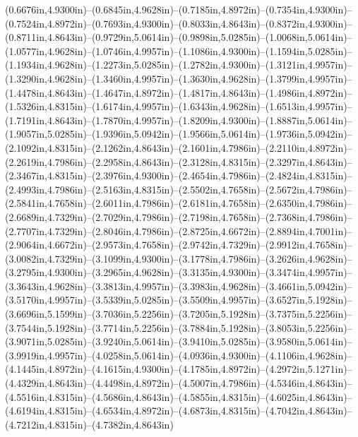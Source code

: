 (0.6676in,4.9300in)--(0.6845in,4.9628in)--(0.7185in,4.8972in)--(0.7354in,4.9300in)--(0.7524in,4.8972in)--(0.7693in,4.9300in)--(0.8033in,4.8643in)--(0.8372in,4.9300in)--(0.8711in,4.8643in)--(0.9729in,5.0614in)--(0.9898in,5.0285in)--(1.0068in,5.0614in)--(1.0577in,4.9628in)--(1.0746in,4.9957in)--(1.1086in,4.9300in)--(1.1594in,5.0285in)--(1.1934in,4.9628in)--(1.2273in,5.0285in)--(1.2782in,4.9300in)--(1.3121in,4.9957in)--(1.3290in,4.9628in)--(1.3460in,4.9957in)--(1.3630in,4.9628in)--(1.3799in,4.9957in)--(1.4478in,4.8643in)--(1.4647in,4.8972in)--(1.4817in,4.8643in)--(1.4986in,4.8972in)--(1.5326in,4.8315in)--(1.6174in,4.9957in)--(1.6343in,4.9628in)--(1.6513in,4.9957in)--(1.7191in,4.8643in)--(1.7870in,4.9957in)--(1.8209in,4.9300in)--(1.8887in,5.0614in)--(1.9057in,5.0285in)--(1.9396in,5.0942in)--(1.9566in,5.0614in)--(1.9736in,5.0942in)--(2.1092in,4.8315in)--(2.1262in,4.8643in)--(2.1601in,4.7986in)--(2.2110in,4.8972in)--(2.2619in,4.7986in)--(2.2958in,4.8643in)--(2.3128in,4.8315in)--(2.3297in,4.8643in)--(2.3467in,4.8315in)--(2.3976in,4.9300in)--(2.4654in,4.7986in)--(2.4824in,4.8315in)--(2.4993in,4.7986in)--(2.5163in,4.8315in)--(2.5502in,4.7658in)--(2.5672in,4.7986in)--(2.5841in,4.7658in)--(2.6011in,4.7986in)--(2.6181in,4.7658in)--(2.6350in,4.7986in)--(2.6689in,4.7329in)--(2.7029in,4.7986in)--(2.7198in,4.7658in)--(2.7368in,4.7986in)--(2.7707in,4.7329in)--(2.8046in,4.7986in)--(2.8725in,4.6672in)--(2.8894in,4.7001in)--(2.9064in,4.6672in)--(2.9573in,4.7658in)--(2.9742in,4.7329in)--(2.9912in,4.7658in)--(3.0082in,4.7329in)--(3.1099in,4.9300in)--(3.1778in,4.7986in)--(3.2626in,4.9628in)--(3.2795in,4.9300in)--(3.2965in,4.9628in)--(3.3135in,4.9300in)--(3.3474in,4.9957in)--(3.3643in,4.9628in)--(3.3813in,4.9957in)--(3.3983in,4.9628in)--(3.4661in,5.0942in)--(3.5170in,4.9957in)--(3.5339in,5.0285in)--(3.5509in,4.9957in)--(3.6527in,5.1928in)--(3.6696in,5.1599in)--(3.7036in,5.2256in)--(3.7205in,5.1928in)--(3.7375in,5.2256in)--(3.7544in,5.1928in)--(3.7714in,5.2256in)--(3.7884in,5.1928in)--(3.8053in,5.2256in)--(3.9071in,5.0285in)--(3.9240in,5.0614in)--(3.9410in,5.0285in)--(3.9580in,5.0614in)--(3.9919in,4.9957in)--(4.0258in,5.0614in)--(4.0936in,4.9300in)--(4.1106in,4.9628in)--(4.1445in,4.8972in)--(4.1615in,4.9300in)--(4.1785in,4.8972in)--(4.2972in,5.1271in)--(4.4329in,4.8643in)--(4.4498in,4.8972in)--(4.5007in,4.7986in)--(4.5346in,4.8643in)--(4.5516in,4.8315in)--(4.5686in,4.8643in)--(4.5855in,4.8315in)--(4.6025in,4.8643in)--(4.6194in,4.8315in)--(4.6534in,4.8972in)--(4.6873in,4.8315in)--(4.7042in,4.8643in)--(4.7212in,4.8315in)--(4.7382in,4.8643in) 